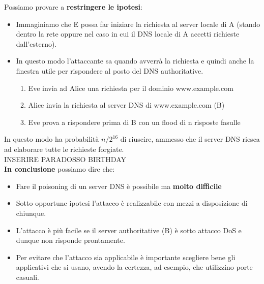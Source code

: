\documentclass[12pt]{article}
\begin{document}
				Possiamo provare a \textbf{restringere le ipotesi}: 
				\begin{itemize}
					\item Immaginiamo che E possa far iniziare la richiesta al server locale di A (stando dentro la rete oppure nel caso in cui il DNS locale di A accetti richieste dall'esterno).
					\item In questo modo l'attaccante sa quando avverrà la richiesta e quindi anche la finestra utile per rispondere al posto del DNS authoritative.
					\begin{enumerate}
						\item Eve invia ad Alice una richiesta per il dominio www.example.com
						\item Alice invia la richiesta al server DNS di www.example.com (B)
						\item Eve prova a rispondere prima di B con un flood di n risposte fasulle
					\end{enumerate}
				\end{itemize}
				In questo modo ha probabilità $n/2^{16}$ di riuscire, ammesso che il server DNS riesca ad elaborare tutte le richieste forgiate.\\
				
				INSERIRE PARADOSSO BIRTHDAY\\
				
				\textbf{In conclusione} possiamo dire che:
				\begin{itemize}
					\item Fare il poisoning di un server DNS è possibile ma \textbf{molto difficile}
					\item Sotto opportune ipotesi l'attacco è realizzabile con mezzi a disposizione di chiunque.
					\item L'attacco è più facile se il server authoritative (B) è sotto attacco DoS e dunque non risponde prontamente.
					\item Per evitare che l'attacco sia applicabile è importante scegliere bene gli applicativi che si usano, avendo la certezza, ad esempio, che utilizzino porte casuali.
				\end{itemize}
\end{document}
